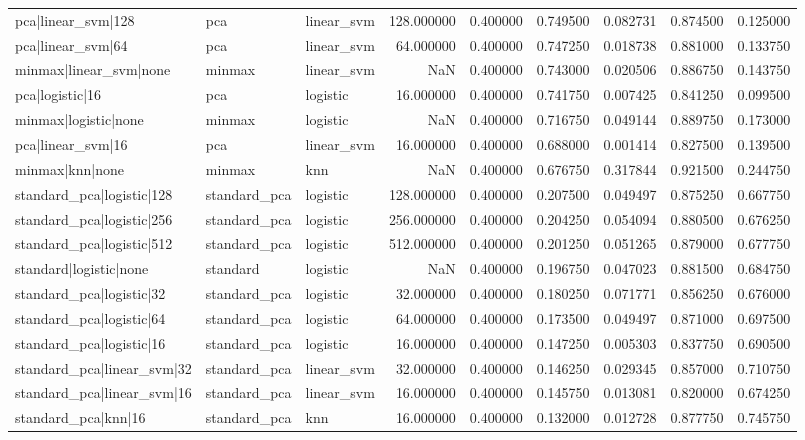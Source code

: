 \begin{tabular}{lllrrrrrr}
pca|linear_svm|128 & pca & linear_svm & 128.000000 & 0.400000 & 0.749500 & 0.082731 & 0.874500 & 0.125000 \\
pca|linear_svm|64 & pca & linear_svm & 64.000000 & 0.400000 & 0.747250 & 0.018738 & 0.881000 & 0.133750 \\
minmax|linear_svm|none & minmax & linear_svm & NaN & 0.400000 & 0.743000 & 0.020506 & 0.886750 & 0.143750 \\
pca|logistic|16 & pca & logistic & 16.000000 & 0.400000 & 0.741750 & 0.007425 & 0.841250 & 0.099500 \\
minmax|logistic|none & minmax & logistic & NaN & 0.400000 & 0.716750 & 0.049144 & 0.889750 & 0.173000 \\
pca|linear_svm|16 & pca & linear_svm & 16.000000 & 0.400000 & 0.688000 & 0.001414 & 0.827500 & 0.139500 \\
minmax|knn|none & minmax & knn & NaN & 0.400000 & 0.676750 & 0.317844 & 0.921500 & 0.244750 \\
standard_pca|logistic|128 & standard_pca & logistic & 128.000000 & 0.400000 & 0.207500 & 0.049497 & 0.875250 & 0.667750 \\
standard_pca|logistic|256 & standard_pca & logistic & 256.000000 & 0.400000 & 0.204250 & 0.054094 & 0.880500 & 0.676250 \\
standard_pca|logistic|512 & standard_pca & logistic & 512.000000 & 0.400000 & 0.201250 & 0.051265 & 0.879000 & 0.677750 \\
standard|logistic|none & standard & logistic & NaN & 0.400000 & 0.196750 & 0.047023 & 0.881500 & 0.684750 \\
standard_pca|logistic|32 & standard_pca & logistic & 32.000000 & 0.400000 & 0.180250 & 0.071771 & 0.856250 & 0.676000 \\
standard_pca|logistic|64 & standard_pca & logistic & 64.000000 & 0.400000 & 0.173500 & 0.049497 & 0.871000 & 0.697500 \\
standard_pca|logistic|16 & standard_pca & logistic & 16.000000 & 0.400000 & 0.147250 & 0.005303 & 0.837750 & 0.690500 \\
standard_pca|linear_svm|32 & standard_pca & linear_svm & 32.000000 & 0.400000 & 0.146250 & 0.029345 & 0.857000 & 0.710750 \\
standard_pca|linear_svm|16 & standard_pca & linear_svm & 16.000000 & 0.400000 & 0.145750 & 0.013081 & 0.820000 & 0.674250 \\
standard_pca|knn|16 & standard_pca & knn & 16.000000 & 0.400000 & 0.132000 & 0.012728 & 0.877750 & 0.745750 \\

\end{tabular}
